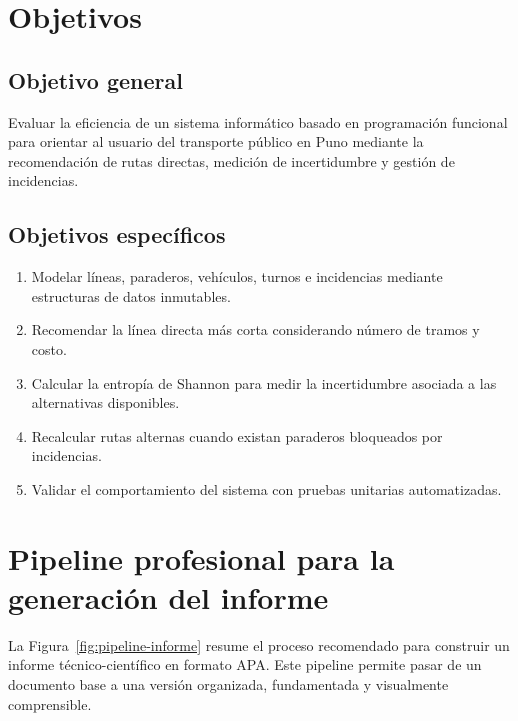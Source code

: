\documentclass[stu,12pt,floatsintext]{apa7}
\begin{document}
\section{Objetivos}
\subsection{Objetivo general}
Evaluar la eficiencia de un sistema informático basado en programación funcional para orientar al usuario del transporte público en Puno mediante la recomendación de rutas directas, medición de incertidumbre y gestión de incidencias.

\subsection{Objetivos específicos}
\begin{enumerate}[label=\alph*)]
    \item Modelar líneas, paraderos, vehículos, turnos e incidencias mediante estructuras de datos inmutables.
    \item Recomendar la línea directa más corta considerando número de tramos y costo.
    \item Calcular la entropía de Shannon para medir la incertidumbre asociada a las alternativas disponibles.
    \item Recalcular rutas alternas cuando existan paraderos bloqueados por incidencias.
    \item Validar el comportamiento del sistema con pruebas unitarias automatizadas.
\end{enumerate}

\section{Pipeline profesional para la generación del informe}
La Figura~\ref{fig:pipeline-informe} resume el proceso recomendado para construir un informe técnico-científico en formato APA. Este pipeline permite pasar de un documento base a una versión organizada, fundamentada y visualmente comprensible.
\end{document}
